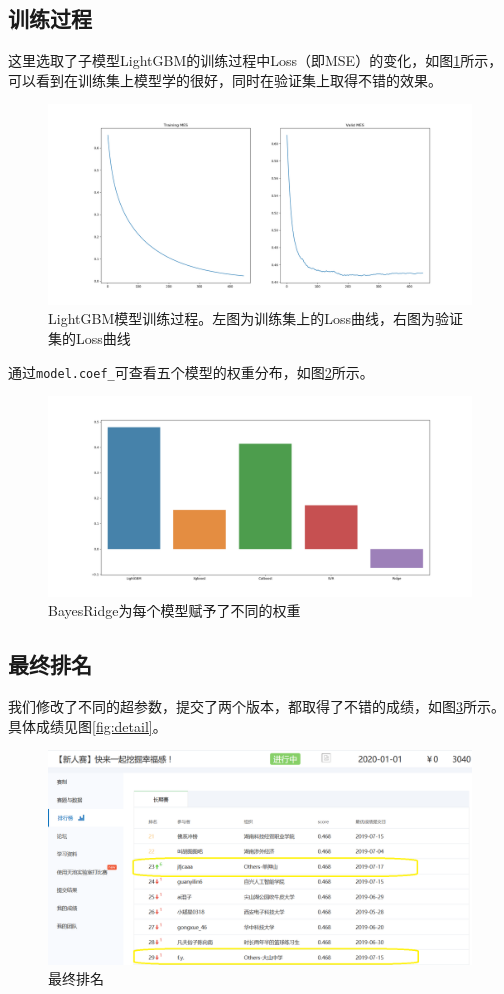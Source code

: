 \documentclass[logo,reportComp]{thesis}
\begin{document}
\subsection{训练过程}

这里选取了子模型LightGBM的训练过程中Loss（即MSE）的变化，如图\ref{fig:mes_lgb}所示，可以看到在训练集上模型学的很好，同时在验证集上取得不错的效果。
\begin{figure}[H]
    \centering
    \includegraphics[width=0.9\linewidth]{fig/mes_lgb.png}
    \caption{LightGBM模型训练过程。左图为训练集上的Loss曲线，右图为验证集的Loss曲线}
    \label{fig:mes_lgb}
\end{figure}

通过\verb'model.coef_'可查看五个模型的权重分布，如图\ref{fig:coef}所示。
\begin{figure}[H]
    \centering
    \includegraphics[width=0.6\linewidth]{fig/coef.png}
    \caption{BayesRidge为每个模型赋予了不同的权重}
    \label{fig:coef}
\end{figure}

\clearpage
\subsection{最终排名}
我们修改了不同的超参数，提交了两个版本，都取得了不错的成绩，如图\ref{fig:ranking}所示。具体成绩见图\ref{fig:detail}。
\begin{figure}[H]
\centering
\includegraphics[width=0.6\linewidth]{fig/rankkk.png}
\caption{最终排名}
\label{fig:ranking}
\end{figure}
\end{document}
